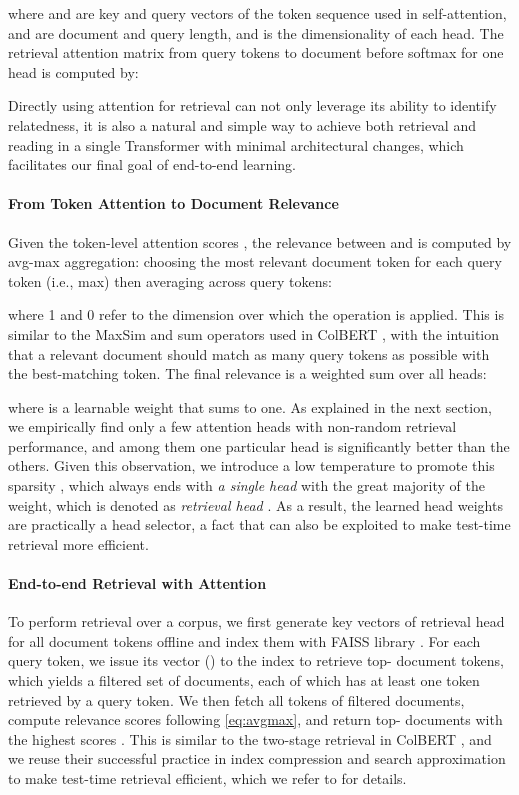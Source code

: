 \documentclass[11pt, dvipsnames]{article}
\begin{document}
where  and  are key and query vectors of the token sequence used in self-attention,  and  are document and query length, and  is the dimensionality of each head.
The retrieval attention matrix from query tokens to document before softmax for one head is computed by:

Directly using attention for retrieval can not only leverage its ability to identify relatedness, it is also a natural and simple way to achieve both retrieval and reading in a single Transformer with minimal architectural changes, which facilitates our final goal of end-to-end learning.

\paragraph{From Token Attention to Document Relevance}
Given the token-level attention scores , the relevance between  and  is computed by avg-max aggregation: choosing the most relevant document token for each query token (i.e., max) then averaging across query tokens:

where 1 and 0 refer to the dimension over which the operation is applied.
This is similar to the MaxSim and sum operators used in ColBERT \cite{colbert-2020-khattab}, with the intuition that a relevant document should match as many query tokens as possible with the best-matching token.
The final relevance is a weighted sum over all heads:

where  is a learnable weight that sums to one.
As explained in the next section, we empirically find only a few attention heads with non-random retrieval performance, and among them one particular head is significantly better than the others.
Given this observation, we introduce a low temperature  to promote this sparsity , which always ends with \emph{a single head} with the great majority of the weight, which is denoted as \emph{retrieval head} .
As a result, the learned head weights are practically a head selector, a fact that can also be exploited to make test-time retrieval more efficient.

\paragraph{End-to-end Retrieval with Attention}
To perform retrieval over a corpus, we first generate key vectors  of retrieval head for all document tokens offline and index them with FAISS library \cite{faiss-2021-johnson}.
For each query token, we issue its vector () to the index to retrieve top- document tokens, which yields a filtered set of documents, each of which has at least one token retrieved by a query token.
We then fetch all tokens of filtered documents, compute relevance scores following \autoref{eq:avgmax}, and return top- documents with the highest scores .
This is similar to the two-stage retrieval in ColBERT \cite{colbert-2020-khattab}, and we reuse their successful practice in index compression and search approximation to make test-time retrieval efficient, which we refer to \citet{colbertv2-2021-santhanam} for details.
\end{document}
